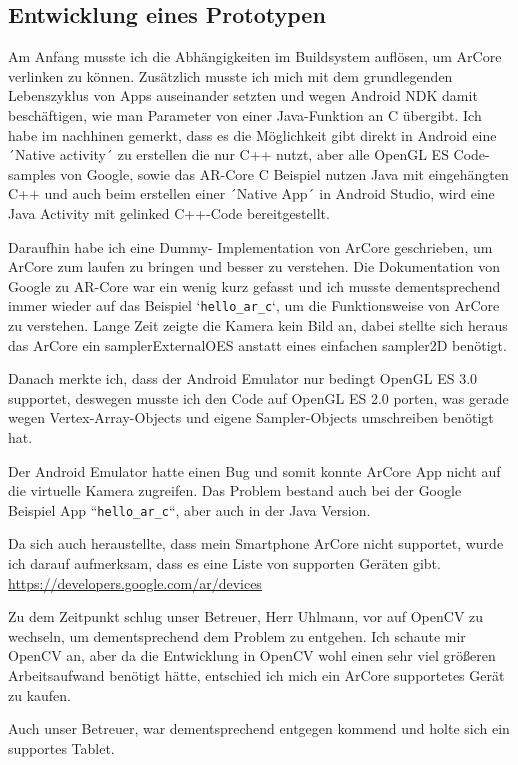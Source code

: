 
\subsection{Entwicklung eines Prototypen}
Am Anfang musste ich die Abhängigkeiten im Buildsystem auflösen, um
ArCore verlinken zu können. Zusätzlich musste ich mich mit dem grundlegenden Lebenszyklus von Apps
auseinander setzten und wegen Android NDK damit beschäftigen, wie man
Parameter von einer Java-Funktion an C übergibt.
Ich habe im nachhinen gemerkt, dass es die Möglichkeit gibt direkt in Android eine
´Native activity´ zu erstellen die nur C++ nutzt, aber alle OpenGL ES Code-samples von Google,
sowie das AR-Core C Beispiel nutzen Java mit eingehängten C++ und auch beim erstellen einer
´Native App´ in Android Studio, wird eine Java Activity mit gelinked C++-Code bereitgestellt.
\par
Daraufhin habe ich eine Dummy-
Implementation von ArCore geschrieben, um ArCore zum laufen zu bringen und besser zu verstehen.
Die Dokumentation von Google zu AR-Core war ein wenig kurz gefasst und ich musste dementsprechend immer wieder auf das Beispiel `\verb|hello_ar_c|`, um die Funktionsweise von ArCore zu verstehen.
Lange Zeit zeigte die Kamera kein Bild an, dabei stellte sich heraus das ArCore ein samplerExternalOES anstatt eines einfachen sampler2D benötigt.
\par
Danach merkte ich, dass der Android Emulator nur bedingt OpenGL ES 3.0 supportet,
deswegen musste ich den Code auf OpenGL ES 2.0 porten, was gerade wegen
Vertex-Array-Objects und eigene Sampler-Objects
umschreiben benötigt hat.
\par
Der Android Emulator hatte einen Bug und somit konnte ArCore App nicht
auf die virtuelle Kamera zugreifen. Das Problem bestand auch bei der Google Beispiel App
``\verb|hello_ar_c|``, aber auch in der Java Version.
\par
Da sich auch heraustellte, dass mein Smartphone ArCore nicht supportet, wurde ich darauf
aufmerksam, dass es eine Liste von supporten Geräten gibt. \url{https://developers.google.com/ar/devices}
\par
Zu dem Zeitpunkt schlug unser Betreuer, Herr Uhlmann, vor auf OpenCV zu wechseln, um dementsprechend dem Problem
zu entgehen. Ich schaute mir OpenCV an, aber da die Entwicklung in OpenCV wohl einen sehr viel
größeren Arbeitsaufwand benötigt hätte, entschied ich mich ein ArCore supportetes Gerät zu kaufen.
\par
Auch unser Betreuer, war dementsprechend entgegen kommend und holte sich ein supportes Tablet.


